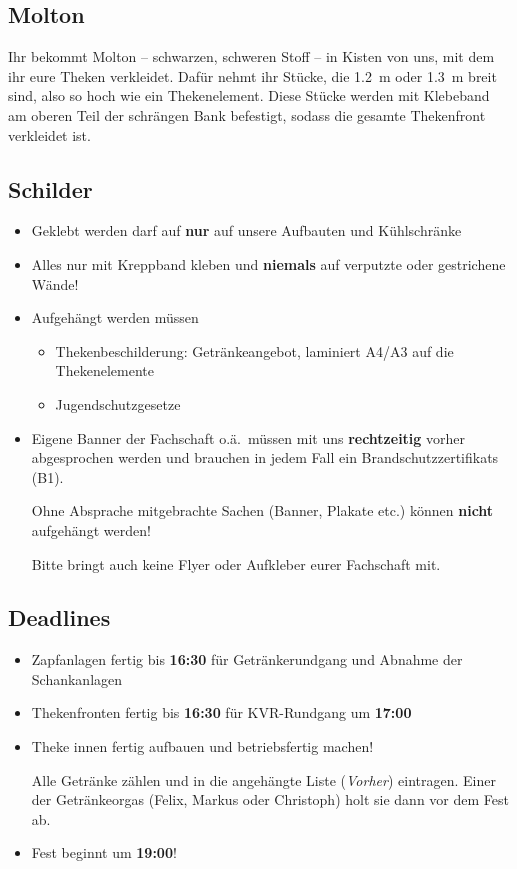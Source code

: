 \subsection{Molton}
Ihr bekommt Molton -- schwarzen, schweren Stoff -- in Kisten von uns, mit dem ihr eure Theken verkleidet. Dafür nehmt ihr Stücke, die \SI{1.2}{\meter} oder \SI{1.3}{\meter} breit sind, also so hoch wie ein Thekenelement. Diese Stücke werden mit Klebeband am oberen Teil der schrängen Bank befestigt, sodass die gesamte Thekenfront verkleidet ist.
\subsection{Schilder}
\begin{itemize}
  \item Geklebt werden darf auf \textbf{nur} auf unsere Aufbauten und Kühlschränke
  \item Alles nur mit Kreppband kleben und \textbf{niemals} auf verputzte oder gestrichene Wände!
  \item Aufgehängt werden müssen
    \begin{itemize}
      \item Thekenbeschilderung: Getränkeangebot, laminiert A4/A3 auf die Thekenelemente
      \item Jugendschutzgesetze
    \end{itemize}
  \item Eigene Banner der Fachschaft o.ä.\ müssen mit uns \textbf{rechtzeitig} vorher abgesprochen werden und brauchen in jedem Fall ein Brandschutzzertifikats (B1).

    Ohne Absprache mitgebrachte Sachen (Banner, Plakate etc.) können \textbf{nicht} aufgehängt werden!

    Bitte bringt auch keine Flyer oder Aufkleber eurer Fachschaft mit.
\end{itemize}
\subsection{Deadlines}
\begin{itemize}
  \item Zapfanlagen fertig bis \textbf{16:30} für Getränkerundgang und Abnahme der Schankanlagen
  \item Thekenfronten fertig bis \textbf{16:30} für KVR-Rundgang um \textbf{17:00}
  \item Theke innen fertig aufbauen und betriebsfertig machen!

    Alle Getränke zählen und in die angehängte Liste (\emph{Vorher}) eintragen. Einer der Getränkeorgas (Felix, Markus oder Christoph) holt sie dann vor dem Fest ab.
  \item \Large{Fest beginnt um \textbf{19:00}!}
\end{itemize}
